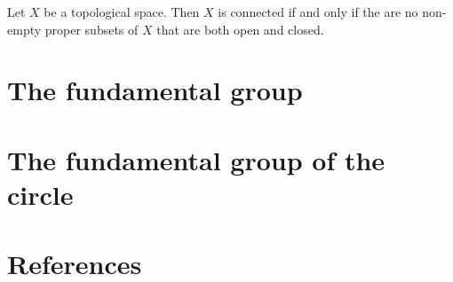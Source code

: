 \documentclass{article}
\theoremstyle{remark}
\begin{document}
\begin{theorem}[Connectivity]
    Let $X$ be a topological space. Then $X$ is connected if and only if the are no non-empty proper subsets of $X$ that
    are both open and closed.
\end{theorem}

\section{ The fundamental group}%
\label{sec:the_fundamental_group}


\section{ The fundamental group of the circle}%
\label{sec:the_fundamental_group_of_the_circle}



\newpage
\section{References}%
\label{sec:references}



\end{document}
